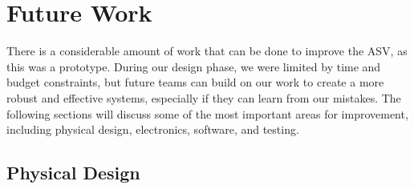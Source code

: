 \section{Future Work}

There is a considerable amount of work that can be done to improve the ASV, as this was a prototype. During our design phase, we were limited by time and budget constraints, but future teams can build on our work to create a more robust and effective systems, especially if they can learn from our mistakes. The following sections will discuss some of the most important areas for improvement, including physical design, electronics, software, and testing. 

\subsection{Physical Design}

